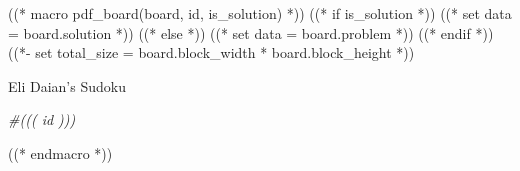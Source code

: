 ((* macro pdf_board(board, id, is_solution) *))
    ((* if is_solution *))
        ((* set data = board.solution *))
    ((* else *))
        ((* set data = board.problem *))
    ((* endif *))
    ((*- set total_size = board.block_width * board.block_height *))

    \pagestyle{empty}
    \begin{center}
    {\huge Eli Daian's Sudoku}

    \vspace{1em}


    \emph{\#((( id )))}
    \end{center}
((* endmacro *))

\documentclass[a4paper, oneside]{article}
\usepackage[margin=2cm]{geometry}
\usepackage{tikz}



((*- if multi_board *))
    ((*- for board, id in boards *))
        ((( pdf_board(board, id, is_solution) )))
        \pagebreak
    ((*- endfor *))
((*- else *))
    ((( pdf_board(board, board_id, is_solution) )))
((*- endif *))


